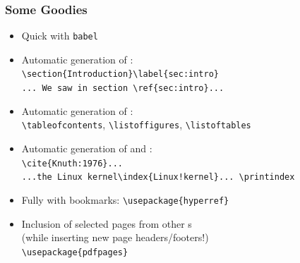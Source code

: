 \begin{frame}[fragile]
\lstset{basicstyle=\ttfamily}
\frametitle{Some Goodies}
\begin{itemize}
\item<+> Quick  with \texttt{babel}
\item<+> Automatic generation of :\\
\lstinline|\section{Introduction}\label{sec:intro}|\\
\lstinline|... We saw in section \ref{sec:intro}...|
\item<+> Automatic generation of :\\
\lstinline[texcs={tableofcontents}]|\tableofcontents|, \lstinline[texcs={listoffigures}]|\listoffigures|,  \lstinline[texcs={listoftables}]|\listoftables|
\item<+> Automatic generation of  and :\\
\lstinline|\cite{Knuth:1976}...|\\
\lstinline[moretexcs={printindex}]|...the Linux kernel\index{Linux!kernel}... \printindex|\\
\item<+> Fully   with bookmarks: \lstinline|\usepackage{hyperref}|
\item<+> Inclusion of selected pages from other s\\(while inserting new page headers/footers!)\\
\lstinline|\usepackage{pdfpages}|\\
\lstinline||
\end{itemize}
\end{frame}

